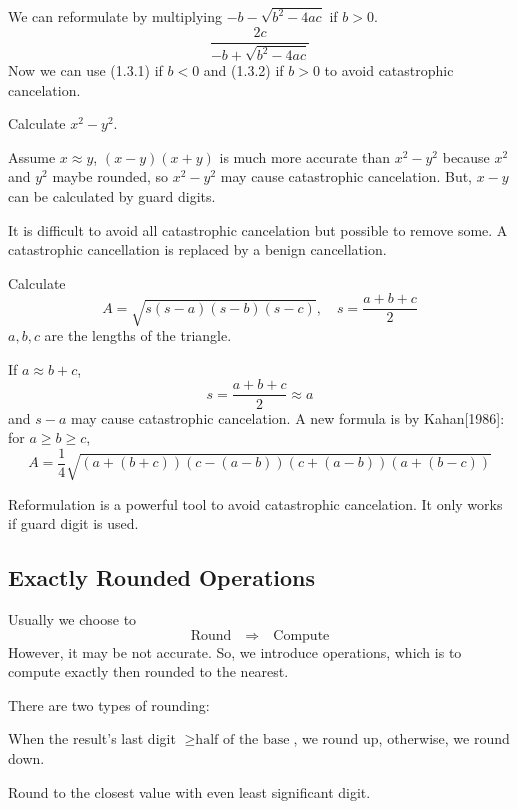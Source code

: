 We can reformulate by multiplying $-b - \sqrt{b^2-4ac}$ if $b>0$.
\[
    \frac{2c}{-b + \sqrt{b^2-4ac}} \tag{1.3.2}
\]
Now we can use (1.3.1) if $b<0$ and (1.3.2) if $b>0$ to avoid catastrophic cancelation.

\begin{eg}
    Calculate $x^2 - y^2$.
\end{eg}

Assume $x \approx y$, $(x-y)(x+y)$ is much more accurate than $x^2 - y^2$ because $x^2$ and $y^2$ maybe rounded, so $x^2 - y^2$ may cause catastrophic cancelation. But, $x-y$ can be calculated by guard digits.

\begin{remark}
    It is difficult to avoid all catastrophic cancelation but possible to remove some. A catastrophic cancellation is replaced by a benign cancellation.
\end{remark}

\newpage

\begin{eg}
    Calculate \[
        A = \sqrt{s(s-a)(s-b)(s-c)},\quad s = \frac{a+b+c}{2} \tag{1.3.3}
    \]
    $a, b, c$ are the lengths of the triangle.
\end{eg}

If $a \approx b + c$, \[
    s = \frac{a+b+c}{2} \approx a
\]
and \(s-a\) may cause catastrophic cancelation. A new formula is by Kahan[1986]: for $a \geq b \geq c$,
\[
    A = \frac{1}{4} \sqrt{(a+(b+c))(c-(a-b))(c+(a-b))(a+(b-c))} \tag{1.3.4}
\]

\begin{remark}
    Reformulation is a powerful tool to avoid catastrophic cancelation. It only works if guard digit is used.
\end{remark}

\subsection{Exactly Rounded Operations}

Usually we choose to \[
    \boxed{\text{Round}} \quad \Rightarrow \quad \boxed{\text{Compute}}
\]
However, it may be not accurate. So, we introduce  operations, which is to compute exactly then rounded to the nearest.

\begin{definition*}
    There are two types of rounding:
    \begin{definition}[Rounding up]
        When the result's last digit $\geq \text{half of the base}$, we round up, otherwise, we round down.
    \end{definition}
    \begin{definition}
        Round to the closest value with even least significant digit.
    \end{definition}
\end{definition*}

